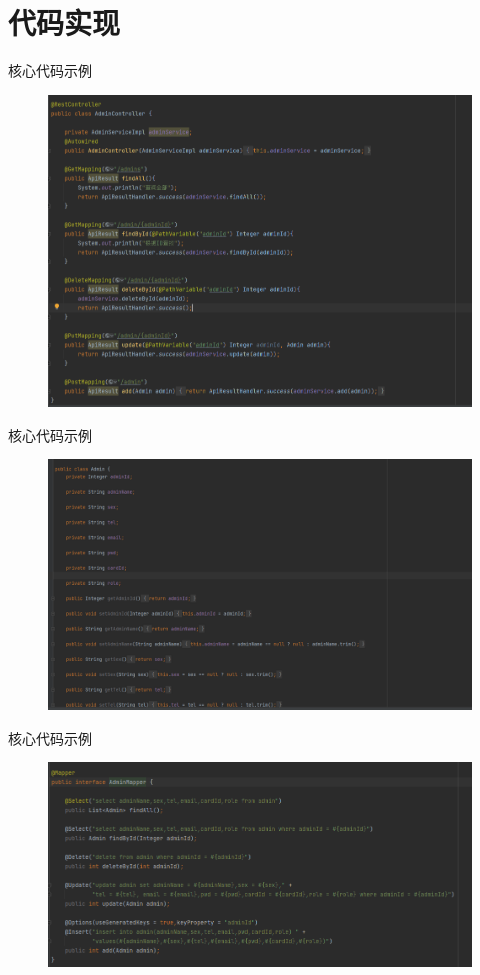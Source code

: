 \documentclass{beamer}
\begin{document}
\section{代码实现}
\begin{frame}{核心代码示例}
    \begin{figure}
        \centering
        \includegraphics[width=0.85\linewidth]{code (1).png}
    \end{figure}
\end{frame}
\begin{frame}{核心代码示例}
    \begin{figure}
        \centering
        \includegraphics[width=0.85\linewidth]{code (2).png}
    \end{figure}
\end{frame}
\begin{frame}{核心代码示例}
    \begin{figure}
        \centering
        \includegraphics[width=0.85\linewidth]{code (3).png}
    \end{figure}
\end{frame}
\end{document}
